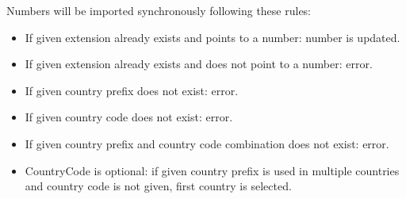 \documentclass[letterpaper,10pt,spanish]{sphinxmanual}
\begin{document}
Numbers will be imported synchronously following these rules:
\begin{itemize}
\item {} 
If given extension already exists and points to a number: number is updated.

\item {} 
If given extension already exists and does not point to a number: error.

\item {} 
If given country prefix does not exist: error.

\item {} 
If given country code does not exist: error.

\item {} 
If given country prefix and country code combination does not exist: error.

\item {} 
CountryCode is optional: if given country prefix is used in multiple countries
and country code is not given, first country is selected.

\end{itemize}
\end{document}
